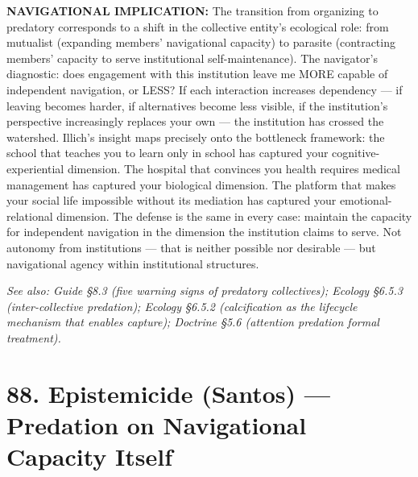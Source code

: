 \textbf{NAVIGATIONAL IMPLICATION:} The transition from organizing to predatory corresponds to a shift in the collective entity's ecological role: from mutualist (expanding members' navigational capacity) to parasite (contracting members' capacity to serve institutional self-maintenance). The navigator's diagnostic: does engagement with this institution leave me MORE capable of independent navigation, or LESS? If each interaction increases dependency — if leaving becomes harder, if alternatives become less visible, if the institution's perspective increasingly replaces your own — the institution has crossed the watershed. Illich's insight maps precisely onto the bottleneck framework: the school that teaches you to learn only in school has captured your cognitive-experiential dimension. The hospital that convinces you health requires medical management has captured your biological dimension. The platform that makes your social life impossible without its mediation has captured your emotional-relational dimension. The defense is the same in every case: maintain the capacity for independent navigation in the dimension the institution claims to serve. Not autonomy from institutions — that is neither possible nor desirable — but navigational agency within institutional structures.


\textit{See also: Guide §8.3 (five warning signs of predatory collectives); Ecology §6.5.3 (inter-collective predation); Ecology §6.5.2 (calcification as the lifecycle mechanism that enables capture); Doctrine §5.6 (attention predation formal treatment).}


\bigskip\noindent\makebox[\textwidth]{\color{rulegray}\rule{5cm}{0.3pt}}\bigskip


\section*{88. Epistemicide (Santos) — Predation on Navigational Capacity Itself}


